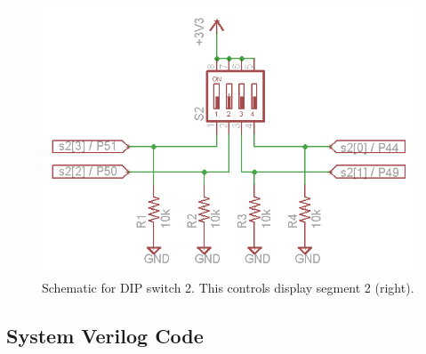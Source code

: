 \documentclass[11pt]{article}
\begin{document}
\begin{figure}[h!]
\centering
\includegraphics[scale=0.54]{s2.png}
\caption{Schematic for DIP switch 2. This controls display segment 2 (right).}
\label{fig:s2_sch}
\end{figure} 


\clearpage
\subsection{System Verilog Code}
\end{document}
